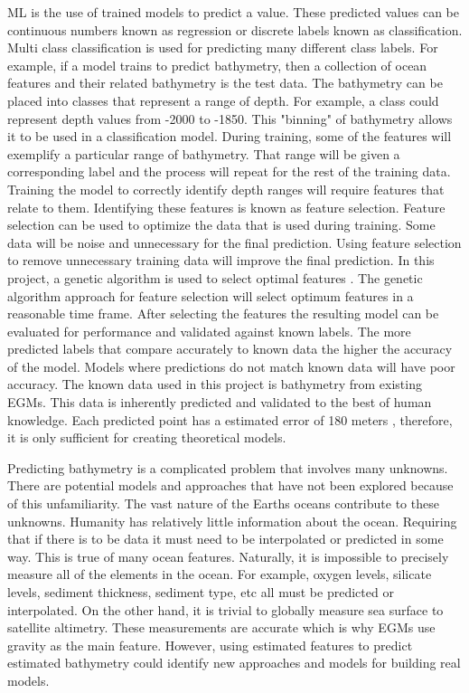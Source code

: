 \par
\ac{ML} is the use of trained models to predict a value.
These predicted values can be continuous numbers known as regression or discrete labels known as classification.
Multi class classification is used for predicting many different class labels.
For example, if a model trains to predict bathymetry, then a collection of ocean features and their related bathymetry is the test data.
The bathymetry can be placed into classes that represent a range of depth.
For example, a class could represent depth values from -2000 to -1850.
This "binning" of bathymetry allows it to be used in a classification model.
During training, some of the features will exemplify a particular range of bathymetry.
That range will be given a corresponding label and the process will repeat for the rest of the training data.
Training the model to correctly identify depth ranges will require features that relate to them.
Identifying these features is known as feature selection.
Feature selection can be used to optimize the data that is used during training.
Some data will be noise and unnecessary for the final prediction.
Using feature selection to remove unnecessary training data will improve the final prediction.
In this project, a genetic algorithm is used to select optimal features \cite{yang1998feature}.
The genetic algorithm approach for feature selection will select optimum features in a reasonable time frame.
After selecting the features the resulting model can be evaluated for performance and validated against known labels.
The more predicted labels that compare accurately to known data the higher the accuracy of the model.
Models where predictions do not match known data will have poor accuracy.
The known data used in this project is bathymetry from existing \ac{EGM}s.
This data is inherently predicted and validated to the best of human knowledge.
Each predicted point has a estimated error of 180 meters \cite{becker2009global}, therefore, it is only sufficient for creating theoretical models.

\par
Predicting bathymetry is a complicated problem that involves many unknowns.
There are potential models and approaches that have not been explored because of this unfamiliarity.
The vast nature of the Earths oceans contribute to these unknowns.
Humanity has relatively little information about the ocean.
Requiring that if there is to be data it must need to be interpolated or predicted in some way.
This is true of many ocean features.
Naturally, it is impossible to precisely measure all of the elements in the ocean.
For example, oxygen levels, silicate levels, sediment thickness, sediment type, etc all must be predicted or interpolated.
On the other hand, it is trivial to globally measure sea surface to satellite altimetry.
These measurements are accurate which is why \ac{EGM}s use gravity as the main feature.
However, using estimated features to predict estimated bathymetry could identify new approaches and models for building real models.

